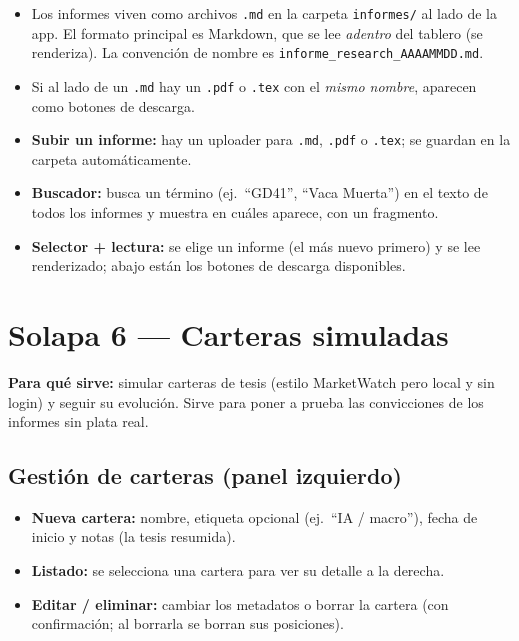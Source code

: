 \documentclass[11pt,a4paper]{article}
\newcommand{\fpath}[1]{\texttt{#1}}
\begin{document}
\begin{itemize}[leftmargin=1.4em]
  \item Los informes viven como archivos \fpath{.md} en la carpeta \fpath{informes/}
  al lado de la app. El formato principal es Markdown, que se lee \emph{adentro} del
  tablero (se renderiza). La convenci\'on de nombre es
  \fpath{informe\_research\_AAAAMMDD.md}.
  \item Si al lado de un \fpath{.md} hay un \fpath{.pdf} o \fpath{.tex} con el
  \emph{mismo nombre}, aparecen como botones de descarga.
  \item \textbf{Subir un informe:} hay un uploader para \fpath{.md}, \fpath{.pdf} o
  \fpath{.tex}; se guardan en la carpeta autom\'aticamente.
  \item \textbf{Buscador:} busca un t\'ermino (ej.\ ``GD41'', ``Vaca Muerta'') en el
  texto de todos los informes y muestra en cu\'ales aparece, con un fragmento.
  \item \textbf{Selector + lectura:} se elige un informe (el m\'as nuevo primero) y se
  lee renderizado; abajo est\'an los botones de descarga disponibles.
\end{itemize}

\section{Solapa 6 --- Carteras simuladas}

\textbf{Para qu\'e sirve:} simular carteras de tesis (estilo MarketWatch pero local y
sin login) y seguir su evoluci\'on. Sirve para poner a prueba las convicciones de los
informes sin plata real.

\subsection{Gesti\'on de carteras (panel izquierdo)}

\begin{itemize}[leftmargin=1.4em]
  \item \textbf{Nueva cartera:} nombre, etiqueta opcional (ej.\ ``IA / macro''),
  fecha de inicio y notas (la tesis resumida).
  \item \textbf{Listado:} se selecciona una cartera para ver su detalle a la derecha.
  \item \textbf{Editar / eliminar:} cambiar los metadatos o borrar la cartera (con
  confirmaci\'on; al borrarla se borran sus posiciones).
\end{itemize}
\end{document}
